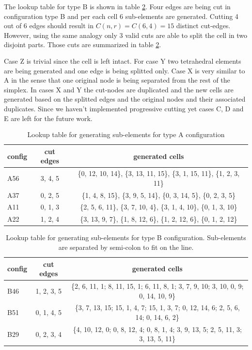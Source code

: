 The lookup table for type B is shown in table \ref{table:lutcutB}. Four edges are being cut in configuration type B and per each cell 6 sub-elements are generated.
Cutting 4 out of 6 edges should result in $C(n, r) = C(6, 4) = 15$ distinct cut-edges. However, using the same analogy only 3 valid cuts are able to split the cell 
in two disjoint parts. Those cuts are summarized in table \ref{table:lutcutB}. 

Case Z is trivial since the cell is left intact. For case Y two tetrahedral elements are being generated and one edge is being splitted only. Case X is very similar to
A in the sense that one original node is being separated from the rest of the simplex. In cases X and Y the cut-nodes are duplicated and the new cells are generated based
on the splitted edges and the original nodes and their associated duplicates. Since we haven't implemented progressive cutting yet cases C, D and E are left for the future work.

\begin{table}[H]
\begin{center}
\caption{\label{table:lutcutA}{Lookup table for generating sub-elements for type A configuration}}
  \begin{tabular}{ | l | c | c | }
    \hline    
    config & cut edges & generated cells \\ \hline \hline    
    A56 & 3, 4, 5 & \{0, 12, 10, 14\}, \{3, 13, 11, 15\}, \{3, 1, 15, 11\}, \{1, 2, 3, 11\} \\ \hline
    A37 & 0, 2, 5 & \{1, 4, 8, 15\}, \{3, 9, 5, 14\}, \{0, 3, 14, 5\}, \{0, 2, 3, 5\} \\ \hline
    A11 & 0, 1, 3 & \{2, 5, 6, 11\}, \{3, 7, 10, 4\}, \{3, 1, 4, 10\}, \{0, 1, 3, 10\} \\ \hline
    A22 & 1, 2, 4 & \{3, 13, 9, 7\}, \{1, 8, 12, 6\}, \{1, 2, 12, 6\}, \{0, 1, 2, 12\} \\ \hline
    \hline
  \end{tabular}
\end{center}
\end{table}

\begin{table}[H]
\begin{center}
\caption{\label{table:lutcutB}{Lookup table for generating sub-elements for type B configuration. 
Sub-elements are separated by semi-colon to fit on the line.}}
  \begin{tabular}{ | l | c | c | }
    \hline    
    config & cut edges & generated cells \\ \hline \hline    
    B46 & 1, 2, 3, 5 & \{2, 6, 11, 1; 8, 11, 15, 1; 6, 11, 8, 1; 3, 7, 9, 10; 3, 10, 0, 9; 0, 14, 10, 9\} \\ \hline
    B51 & 0, 1, 4, 5 & \{3, 7, 13, 15; 15, 1, 4, 7; 15, 1, 3, 7; 0, 12, 14, 6; 2, 5, 6, 14; 0, 14, 6, 2\} \\ \hline
    B29 & 0, 2, 3, 4 & \{4, 10, 12, 0; 0, 8, 12, 4; 0, 8, 1, 4; 3, 9, 13, 5; 2, 5, 11, 3; 3, 13, 5, 11\} \\ \hline
    \hline
  \end{tabular}
\end{center}
\end{table}



